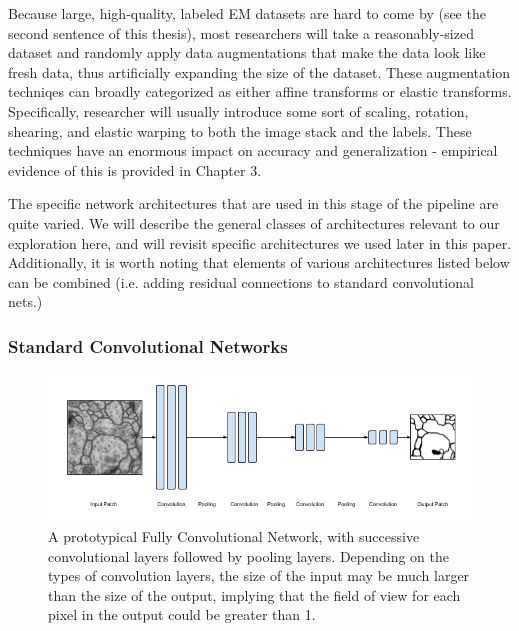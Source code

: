 Because large, high-quality, labeled EM datasets are hard to come by (see the second sentence of this thesis), most researchers will take a reasonably-sized dataset and randomly apply data augmentations that make the data look like fresh data, thus artificially expanding the size of the dataset. These augmentation techniqes can broadly categorized as either affine transforms or elastic transforms. Specifically, researcher will usually introduce some sort of scaling, rotation, shearing, and elastic warping to both the image stack and the labels. These techniques have an enormous impact on accuracy and generalization - empirical evidence of this  is provided in Chapter 3.

The specific network architectures that are used in this stage of the pipeline are quite varied. We will describe the general classes of architectures relevant to our exploration here, and will revisit specific architectures we used later in this paper. Additionally, it is worth noting that elements of various architectures listed below can be combined (i.e. adding residual connections to standard convolutional nets.)

\subsubsection{Standard Convolutional Networks}

\begin{figure}
\centering
\includegraphics[width=\textwidth]{img/Fully_Convolutional_Network.png}
\caption[A prototypical Fully Convolutional Neural Network]{A prototypical Fully Convolutional Network, with successive convolutional layers followed by pooling layers. Depending on the types of convolution layers, the size of the input may be much larger than the size of the output, implying that the field of view for each pixel in the output could be greater than 1.}
\label{fig:fully_conv_net}
\end{figure}

